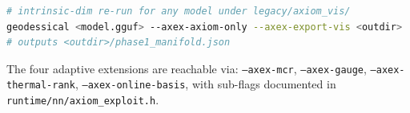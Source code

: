 \documentclass[11pt]{article}
\begin{document}
\begin{lstlisting}[language=bash]
# intrinsic-dim re-run for any model under legacy/axiom_vis/
geodessical <model.gguf> --axex-axiom-only --axex-export-vis <outdir>
# outputs <outdir>/phase1_manifold.json
\end{lstlisting}

The four adaptive extensions are reachable via:
\texttt{--axex-mcr}, \texttt{--axex-gauge}, \texttt{--axex-thermal-rank},
\texttt{--axex-online-basis}, with sub-flags documented in
\texttt{runtime/nn/axiom\_exploit.h}.

\section*{}

\clearpage
\printbibliography
\end{document}
